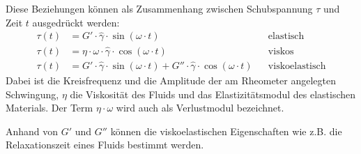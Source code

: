 Diese Beziehungen können als Zusammenhang zwischen Schubspannung $\tau$ und Zeit $t$ ausgedrückt werden:
\begin{align}
    \label{eq:schwingungsmodi}
    \tau\left( t \right)&=G'\cdot\hat{\gamma}\cdot \sin\left( \omega\cdot t \right) && \text{elastisch}\\
    \tau\left( t \right)&=\eta\cdot\omega\cdot\hat{\gamma}\cdot \cos\left( \omega\cdot t \right)&& \text{viskos}\\
    \tau\left( t \right)&=G'\cdot\hat{\gamma}\cdot \sin\left( \omega\cdot t \right)+G''\cdot\hat{\gamma}\cdot \cos\left( \omega\cdot t \right)&& \text{viskoelastisch}
\end{align}
Dabei ist  die Kreisfrequenz und  die Amplitude der am Rheometer angelegten Schwingung, $\eta$ die Viskosität des Fluids und  das Elastizitätsmodul des elastischen Materials. Der Term $\eta\cdot\omega$ wird auch als Verlustmodul  bezeichnet.

Anhand von $G'$ und $G''$ können die viskoelastischen Eigenschaften wie z.B. die Relaxationszeit eines Fluids bestimmt werden.

